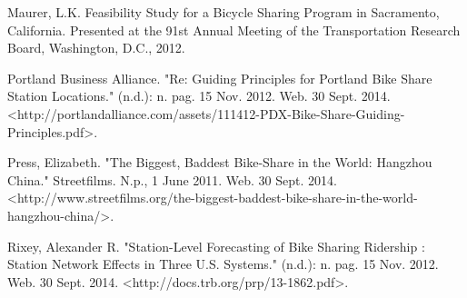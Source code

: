 \documentclass{sig-alternate}
\begin{document}
\begin{enumerate*}
\item Maurer, L.K. Feasibility Study for a Bicycle Sharing Program in Sacramento, California. Presented at the 91st Annual Meeting of the Transportation Research Board, Washington, D.C., 2012.  \newline

\item Portland Business Alliance. "Re: Guiding Principles for Portland Bike Share Station Locations." (n.d.): n. pag. 15 Nov. 2012. Web. 30 Sept. 2014. \newline<http://portlandalliance.com/assets/111412-PDX-\newline Bike-Share-Guiding-Principles.pdf>. \newline

\item Press, Elizabeth. "The Biggest, Baddest Bike-Share in the World: Hangzhou China." Streetfilms. N.p., 1 June 2011. Web. 30 Sept. 2014. \newline<http://www.streetfilms.org/the-biggest-baddest-bike-share-in-the-world-hangzhou-china/>. \newline

\item Rixey, Alexander R. "Station-Level Forecasting of Bike Sharing Ridership : Station Network Effects in Three U.S. Systems." (n.d.): n. pag. 15 Nov. 2012. Web. 30 Sept. 2014. <http://docs.trb.org/prp/13-1862.pdf>. \newline

\end{enumerate*}
\end{document}
